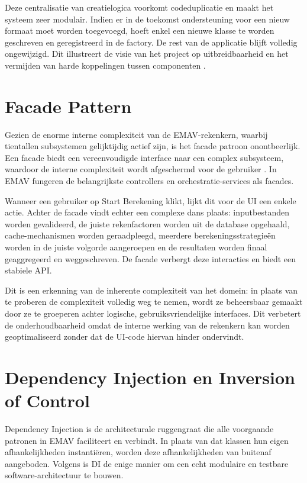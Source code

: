 Deze centralisatie van creatielogica voorkomt codeduplicatie en maakt het systeem zeer modulair. 
Indien er in de toekomst ondersteuning voor een nieuw formaat moet worden toegevoegd, hoeft enkel een nieuwe klasse te worden geschreven en geregistreerd in de factory. 
De rest van de applicatie blijft volledig ongewijzigd. 
Dit illustreert de visie van het project op uitbreidbaarheid en het vermijden van harde koppelingen tussen componenten \autocite{gof1994}.

\section{Facade Pattern}
Gezien de enorme interne complexiteit van de EMAV-rekenkern, waarbij tientallen subsystemen gelijktijdig actief zijn, is het facade patroon onontbeerlijk. 
Een facade biedt een vereenvoudigde interface naar een complex subsysteem, waardoor de interne complexiteit wordt afgeschermd voor de gebruiker \autocite{gof1994}. 
In EMAV fungeren de belangrijkste controllers en orchestratie-services als facades.

Wanneer een gebruiker op Start Berekening klikt, lijkt dit voor de UI een enkele actie. 
Achter de facade vindt echter een complexe dans plaats: inputbestanden worden gevalideerd, de juiste rekenfactoren worden uit de database opgehaald, cache-mechanismen worden geraadpleegd, meerdere berekeningsstrategieën worden in de juiste volgorde aangeroepen en de resultaten worden finaal geaggregeerd en weggeschreven. 
De facade verbergt deze interacties en biedt een stabiele API.

Dit is een erkenning van de inherente complexiteit van het domein: in plaats van te proberen de complexiteit volledig weg te nemen, wordt ze beheersbaar gemaakt door ze te groeperen achter logische, gebruiksvriendelijke interfaces. Dit verbetert de onderhoudbaarheid omdat de interne werking van de rekenkern kan worden geoptimaliseerd zonder dat de UI-code hiervan hinder ondervindt.

\section{Dependency Injection en Inversion of Control}
{\sloppy Dependency Injection is de architecturale ruggengraat die alle voorgaande patronen in EMAV faciliteert en verbindt. In plaats van dat klassen hun eigen afhankelijkheden instantiëren, worden deze afhankelijkheden van buitenaf aangeboden. Volgens \textcite{seemann2019di} is DI de enige manier om een echt modulaire en testbare software-architectuur te bouwen.\par}

